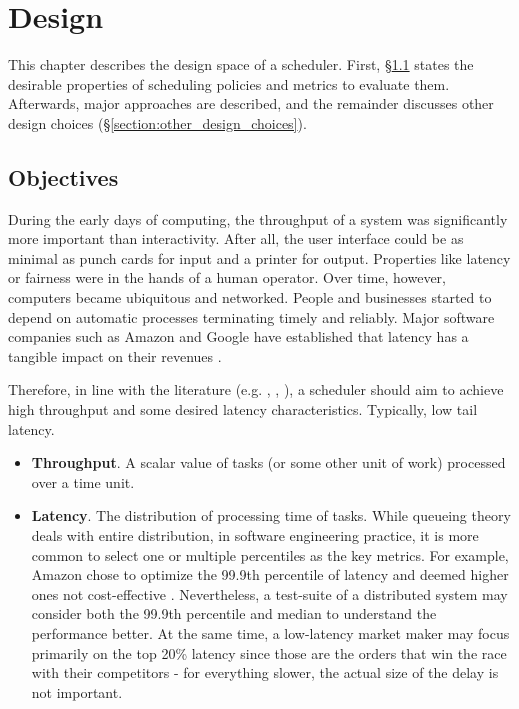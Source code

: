 \documentclass[12pt,a4paper,twoside]{report}
\begin{document}
\chapter{Design}
This chapter describes the design space of a scheduler. First,  \S\ref{section:objectives} states the desirable properties of scheduling policies and metrics to evaluate them. Afterwards, major approaches are described, and the remainder discusses other design choices (\S\ref{section:other_design_choices}).

\section{Objectives}
\label{section:objectives}
During the early days of computing, the throughput of a system was significantly more important than interactivity. After all, the user interface could be as minimal as punch cards for input and a printer for output. Properties like latency or fairness were in the hands of a human operator. Over time, however, computers became ubiquitous and networked. People and businesses started to depend on automatic processes terminating timely and reliably. Major software companies such as Amazon and Google have established that latency has a tangible impact on their revenues \cite{Kleppmann2017-en}.

Therefore, in line with the literature (e.g. \cite{8057206}, \cite{latthrough}, \cite{Sun2021}), a scheduler should aim to achieve high throughput and some desired latency characteristics. Typically, low tail latency.
\begin{itemize}
    \item \textbf{Throughput}. A scalar value of tasks (or some other unit of work) processed over a time unit.
    \item \textbf{Latency}. The distribution of processing time of tasks. While queueing theory deals with entire distribution, in software engineering practice, it is more common to select one or multiple percentiles as the key metrics. For example, Amazon chose to optimize the 99.9th percentile of latency and deemed higher ones not cost-effective \cite{Kleppmann2017-en}. Nevertheless, a test-suite of a distributed system may consider both the 99.9th percentile and median to understand the performance better. At the same time, a low-latency market maker may focus primarily on the top 20\% latency since those are the orders that win the race with their competitors - for everything slower, the actual size of the delay is not important. 
\end{itemize}
\end{document}
